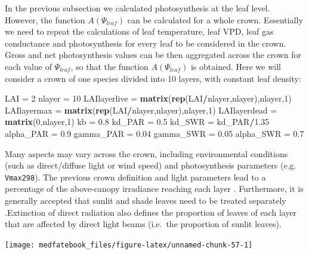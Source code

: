 \documentclass[]{book}
\newenvironment{Shaded}{\begin{snugshade}}{\end{snugshade}}
\newcommand{\KeywordTok}[1]{\textcolor[rgb]{0.13,0.29,0.53}{\textbf{#1}}}
\newcommand{\DecValTok}[1]{\textcolor[rgb]{0.00,0.00,0.81}{#1}}
\newcommand{\FloatTok}[1]{\textcolor[rgb]{0.00,0.00,0.81}{#1}}
\newcommand{\StringTok}[1]{\textcolor[rgb]{0.31,0.60,0.02}{#1}}
\newcommand{\OperatorTok}[1]{\textcolor[rgb]{0.81,0.36,0.00}{\textbf{#1}}}
\newcommand{\NormalTok}[1]{#1}
\begin{document}
In the previous subsection we calculated photosynthesis at the leaf level. However, the function \(A(\Psi_{leaf})\) can be calculated for a whole crown. Essentially we need to repeat the calculations of leaf temperature, leaf VPD, leaf gas conductance and photosynthesis for every leaf to be considered in the crown. Gross and net photosynthesis values can be then aggregated across the crown for each value of \(\Psi_{leaf}\), so that the function \(A(\Psi_{leaf})\) is obtained. Here we will consider a crown of one species divided into 10 layers, with constant leaf density:

\begin{Shaded}
\begin{Highlighting}[]
\NormalTok{LAI =}\StringTok{ }\DecValTok{2}
\NormalTok{nlayer =}\StringTok{ }\DecValTok{10}
\NormalTok{LAIlayerlive =}\StringTok{ }\KeywordTok{matrix}\NormalTok{(}\KeywordTok{rep}\NormalTok{(LAI}\OperatorTok{/}\NormalTok{nlayer,nlayer),nlayer,}\DecValTok{1}\NormalTok{)}
\NormalTok{LAIlayermax =}\StringTok{ }\KeywordTok{matrix}\NormalTok{(}\KeywordTok{rep}\NormalTok{(LAI}\OperatorTok{/}\NormalTok{nlayer,nlayer),nlayer,}\DecValTok{1}\NormalTok{)}
\NormalTok{LAIlayerdead =}\StringTok{ }\KeywordTok{matrix}\NormalTok{(}\DecValTok{0}\NormalTok{,nlayer,}\DecValTok{1}\NormalTok{)}
\NormalTok{kb =}\StringTok{ }\FloatTok{0.8}
\NormalTok{kd_PAR =}\StringTok{ }\FloatTok{0.5}
\NormalTok{kd_SWR =}\StringTok{ }\NormalTok{kd_PAR}\OperatorTok{/}\FloatTok{1.35}
\NormalTok{alpha_PAR =}\StringTok{ }\FloatTok{0.9}
\NormalTok{gamma_PAR =}\StringTok{ }\FloatTok{0.04}
\NormalTok{gamma_SWR =}\StringTok{ }\FloatTok{0.05}
\NormalTok{alpha_SWR =}\StringTok{ }\FloatTok{0.7}
\end{Highlighting}
\end{Shaded}

Many aspects may vary across the crown, including environmental conditions (such as direct/diffuse light or wind speed) and photosynthesis parameters (e.g. \texttt{Vmax298}). The previous crown definition and light parameters lead to a percentage of the above-canopy irradiance reaching each layer \citep{Anten2016}. Furthermore, it is generally accepted that sunlit and shade leaves need to be treated separately \citep{DePury1997}.Extinction of direct radiation also defines the proportion of leaves of each layer that are affected by direct light beams (i.e.~the proportion of sunlit leaves).

\begin{center}\texttt{[image: medfatebook\_files/figure-latex/unnamed-chunk-57-1]} \end{center}
\end{document}
